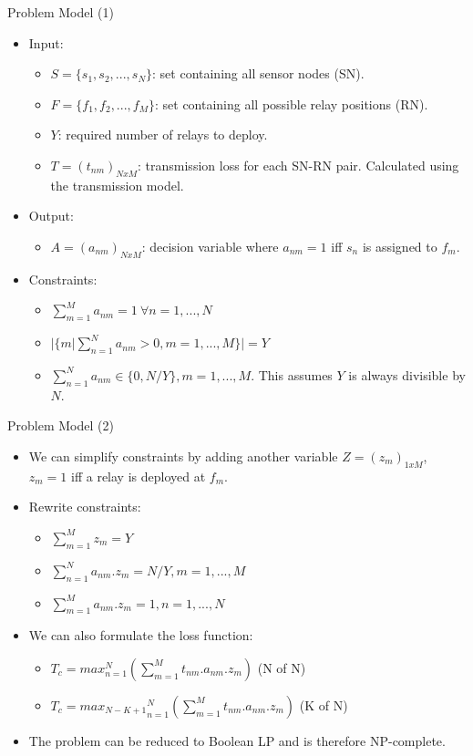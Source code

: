 \documentclass[main.tex]{subfiles}
\begin{document}
\begin{frame}{Problem Model (1)}
	\begin{itemize}
		\item {
			Input:
			\begin{itemize}
				\item $S = \{s_1, s_2, ..., s_N \}$: set containing all sensor nodes (SN).
				\item $F = \{f_1, f_2, ..., f_M \}$: set containing all possible relay positions (RN).
				\item $Y$: required number of relays to deploy.
				\item $T = (t_{nm})_{NxM}$: transmission loss for each SN-RN pair. Calculated using the transmission model.
			\end{itemize}					
		}
		
		\item {
			Output:
			\begin{itemize}
				\item $A = (a_{nm})_{NxM}$: decision variable where $a_{nm} = 1$ iff $s_n$ is assigned to $f_m$.
			\end{itemize}					
		}
		
		\item {
			Constraints:
			\begin{itemize}
				\item $\sum_{m=1}^{M} a_{nm} = 1\ \forall n = 1,...,N$
				\item $|\{ m | \sum_{n=1}^N a_{nm} > 0, m = 1,...,M \}| = Y$
				\item $\sum_{n=1}^N a_{nm} \in \{ 0, N/Y \}, m = 1,...,M$. This assumes $Y$ is always divisible by $N$.
			\end{itemize}					
		}
	\end{itemize}
\end{frame}

\begin{frame}{Problem Model (2)}
\begin{itemize}
	\item We can simplify constraints by adding another variable $Z = (z_m)_{1xM}$, $z_m = 1$ iff a relay is deployed at $f_m$.
	\item {
		Rewrite constraints:
		\begin{itemize}
			\item $\sum_{m=1}^M z_m = Y$
			\item $\sum_{n=1}^N a_{nm} . z_m = N/Y, m = 1,...,M$
			\item $\sum_{m=1}^M a_{nm} . z_m = 1, n = 1,...,N$  
		\end{itemize}
	}
	\item {
		We can also formulate the loss function:
		\begin{itemize}
			\item $T_c = max_{n=1}^N (\sum_{m=1}^M t_{nm} . a_{nm} . z_{m})$ (N of N)
			\item $T_c = {max_{N-K+1}}_{n=1}^N (\sum_{m=1}^M t_{nm} . a_{nm} . z_{m})$ (K of N)
		\end{itemize}
	}
	\item The problem can be reduced to Boolean LP and is therefore NP-complete.
\end{itemize}
\end{frame}
\end{document}
